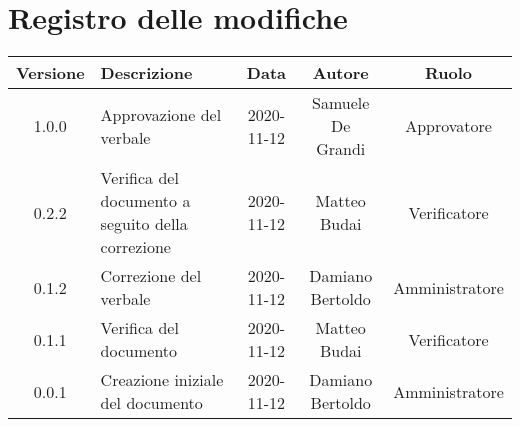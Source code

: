 \section*{Registro delle modifiche}

\begin{center}
	\begin{longtable}{|c|p{5cm}|c|c|c|}
	\hline
	\rowcolor{lighter-grayer}
	\textbf{Versione} & \textbf{Descrizione} & \textbf{Data} & \textbf{Autore} & \textbf{Ruolo} \\
	\hline
	\endfirsthead


	\hline
	1.0.0 & Approvazione del verbale & 2020-11-12 & Samuele De Grandi & Approvatore \\
	\hline
	0.2.2 & Verifica del documento a seguito della correzione & 2020-11-12 & Matteo Budai & Verificatore \\
	\hline
	0.1.2 & Correzione del verbale & 2020-11-12 & Damiano Bertoldo & Amministratore \\
	\hline
	0.1.1 & Verifica del documento & 2020-11-12 & Matteo Budai & Verificatore \\
	\hline
	0.0.1 & Creazione iniziale del documento & 2020-11-12 & Damiano Bertoldo & Amministratore \\
	\hline
	\end{longtable}
\end{center}